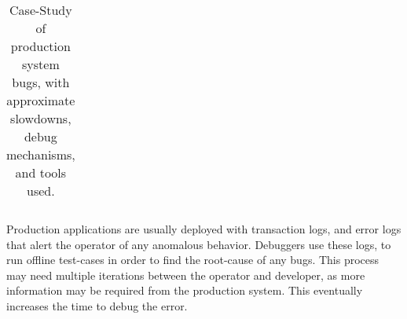 \begin{table*}[ht!]
\begin{tabular}{|c|c|c|c|c|c|c|c|}
\end{tabular}\caption{Case-Study of production system bugs, with approximate slowdowns, debug mechanisms, and tools used.}
\label{table:casestudy}
\end{table*}



Production applications are usually deployed with transaction logs, and error logs that alert the operator of any anomalous behavior.
Debuggers use these logs, to run offline test-cases in order to find the root-cause of any bugs. 
This process may need multiple iterations between the operator and developer, as more information may be required from the production system. This eventually increases the time to debug the error.

